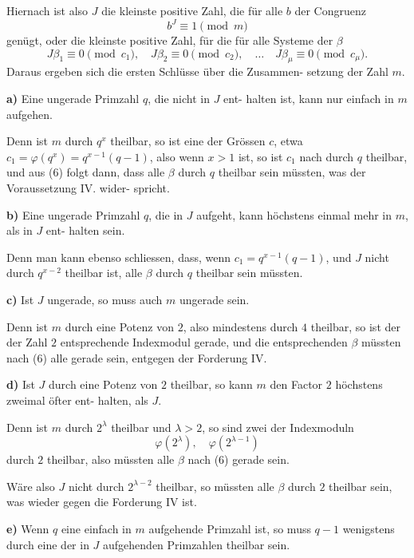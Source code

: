 \documentclass[12pt,a4paper]{article}
\begin{document}
Hiernach ist also $J$ die kleinste positive Zahl, die für alle $b$
der Congruenz
\[b^J \equiv 1 \pmod{m}\]
genügt, oder die kleinste positive Zahl, für die für alle Systeme
der $\beta$
\begin{equation}\label{eq:k21-6}
J\beta_1 \equiv 0 \pmod{c_1},\quad J\beta_2 \equiv 0 \pmod{c_2},\quad \ldots\quad J\beta_\mu \equiv 0 \pmod{c_\mu}.
\end{equation}
Daraus ergeben sich die ersten Schlüsse über die Zusammen-
setzung der Zahl $m$.

\medskip
\noindent\textbf{a)} Eine ungerade Primzahl $q$, die nicht in $J$ ent-
halten ist, kann nur einfach in $m$ aufgehen.

Denn ist $m$ durch $q^x$ theilbar, so ist eine der Grössen $c$,
etwa $c_1 = \varphi(q^x) = q^{x-1}(q-1)$, also wenn $x > 1$ ist, so ist $c_1$
nach durch $q$ theilbar, und aus (6) folgt dann, dass alle $\beta$
durch $q$ theilbar sein müssten, was der Voraussetzung IV. wider-
spricht.

\medskip
\noindent\textbf{b)} Eine ungerade Primzahl $q$, die in $J$ aufgeht,
kann höchstens einmal mehr in $m$, als in $J$ ent-
halten sein.

Denn man kann ebenso schliessen, dass, wenn $c_1 = q^{x-1}(q-1)$,
und $J$ nicht durch $q^{x-2}$ theilbar ist, alle $\beta$ durch $q$ theilbar sein
müssten.

\medskip
\noindent\textbf{c)} Ist $J$ ungerade, so muss auch $m$ ungerade sein.

Denn ist $m$ durch eine Potenz von $2$, also mindestens durch
$4$ theilbar, so ist der der Zahl $2$ entsprechende Indexmodul
gerade, und die entsprechenden $\beta$ müssten nach (6) alle gerade
sein, entgegen der Forderung IV.

\medskip
\noindent\textbf{d)} Ist $J$ durch eine Potenz von $2$ theilbar, so kann
$m$ den Factor $2$ höchstens zweimal öfter ent-
halten, als $J$.

Denn ist $m$ durch $2^\lambda$ theilbar und $\lambda > 2$, so sind zwei der
Indexmoduln
\[\varphi(2^\lambda), \quad \varphi(2^{\lambda-1})\]
durch $2$ theilbar, also müssten alle $\beta$ nach (6) gerade sein.

Wäre also $J$ nicht durch $2^{\lambda-2}$ theilbar, so müssten alle $\beta$
durch $2$ theilbar sein, was wieder gegen die Forderung IV ist.

\medskip
\noindent\textbf{e)} Wenn $q$ eine einfach in $m$ aufgehende Primzahl
ist, so muss $q-1$ wenigstens durch eine der in
$J$ aufgehenden Primzahlen theilbar sein.
\end{document}

